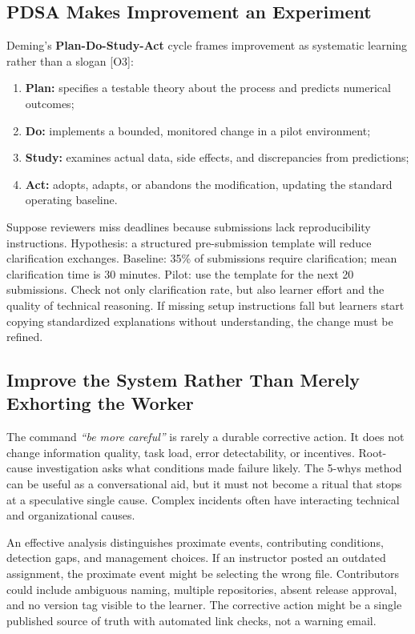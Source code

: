 \subsection{PDSA Makes Improvement an Experiment}
\label{sec:pdsa_cycle}

Deming's \textbf{Plan-Do-Study-Act} cycle frames improvement as systematic learning rather than a slogan [O3]:
\begin{enumerate}
    \item \textbf{Plan:} specifies a testable theory about the process and predicts numerical outcomes;
    \item \textbf{Do:} implements a bounded, monitored change in a pilot environment;
    \item \textbf{Study:} examines actual data, side effects, and discrepancies from predictions;
    \item \textbf{Act:} adopts, adapts, or abandons the modification, updating the standard operating baseline.
\end{enumerate}

Suppose reviewers miss deadlines because submissions lack reproducibility instructions. Hypothesis: a structured pre-submission template will reduce clarification exchanges. Baseline: 35\% of submissions require clarification; mean clarification time is 30 minutes. Pilot: use the template for the next 20 submissions. Check not only clarification rate, but also learner effort and the quality of technical reasoning. If missing setup instructions fall but learners start copying standardized explanations without understanding, the change must be refined.

\subsection{Improve the System Rather Than Merely Exhorting the Worker}
\label{sec:system_vs_exhortation}

The command \textit{``be more careful''} is rarely a durable corrective action. It does not change information quality, task load, error detectability, or incentives. Root-cause investigation asks what conditions made failure likely. The 5-whys method can be useful as a conversational aid, but it must not become a ritual that stops at a speculative single cause. Complex incidents often have interacting technical and organizational causes.

An effective analysis distinguishes proximate events, contributing conditions, detection gaps, and management choices. If an instructor posted an outdated assignment, the proximate event might be selecting the wrong file. Contributors could include ambiguous naming, multiple repositories, absent release approval, and no version tag visible to the learner. The corrective action might be a single published source of truth with automated link checks, not a warning email.

